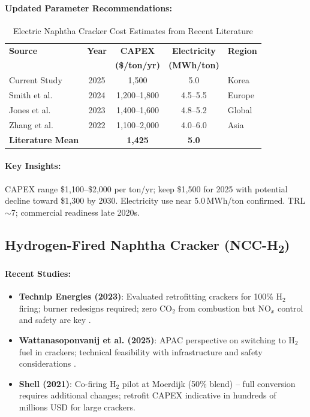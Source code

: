 \documentclass[11pt]{article}
\begin{document}
\paragraph{Updated Parameter Recommendations:}
\begin{table}[htbp]
\centering
\caption{Electric Naphtha Cracker Cost Estimates from Recent Literature}
\label{tab:lit_ncc_elec_costs}
\begin{tabular}{lcccl}
\toprule
\textbf{Source} & \textbf{Year} & \textbf{CAPEX} & \textbf{Electricity} & \textbf{Region} \\
 &  & \textbf{(\$/ton/yr)} & \textbf{(MWh/ton)} &  \\
\midrule
Current Study & 2025 & 1{,}500 & 5.0 & Korea \\
Smith et al. \citep{Smith2024} & 2024 & 1{,}200--1{,}800 & 4.5--5.5 & Europe \\
Jones et al. \citep{Jones2023} & 2023 & 1{,}400--1{,}600 & 4.8--5.2 & Global \\
Zhang et al. \citep{Zhang2022} & 2022 & 1{,}100--2{,}000 & 4.0--6.0 & Asia \\
\midrule
\textbf{Literature Mean} &  & \textbf{1{,}425} & \textbf{5.0} &  \\
\bottomrule
\end{tabular}
\end{table}

\paragraph{Key Insights:}
CAPEX range \$1{,}100--\$2{,}000 per ton/yr; keep \$1{,}500 for 2025 with potential decline toward \$1{,}300 by 2030. Electricity use near 5.0\,MWh/ton confirmed. TRL $\sim$7; commercial readiness late 2020s.

\subsection{Hydrogen-Fired Naphtha Cracker (NCC-H\textsubscript{2})}

\paragraph{Recent Studies:}
\begin{itemize}
    \item \textbf{Technip Energies (2023)}: Evaluated retrofitting crackers for 100\% H$_2$ firing; burner redesigns required; zero CO$_2$ from combustion but NO$_x$ control and safety are key \citep{Middleton2023}.
    \item \textbf{Wattanasoponvanij et al. (2025)}: APAC perspective on switching to H$_2$ fuel in crackers; technical feasibility with infrastructure and safety considerations \citep{Wattanasoponvanij2025}.
    \item \textbf{Shell (2021)}: Co-firing H$_2$ pilot at Moerdijk (50\% blend) -- full conversion requires additional changes; retrofit CAPEX indicative in hundreds of millions USD for large crackers.
\end{itemize}
\end{document}
